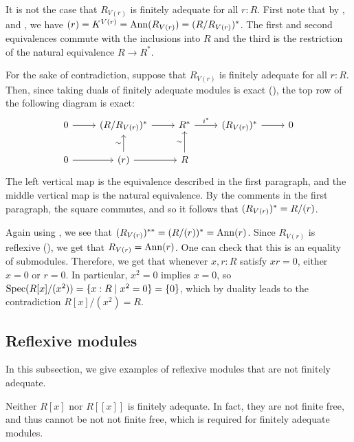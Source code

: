 \begin{counterexample}\label{cex:R_V(r)-not-reflexive}
  It is not the case that $R_{V(r)}$ is finitely adequate for all $r : R$.
  First note that by ,  and , we have $(r) = K^{V(r)} = \operatorname{Ann}(R_{V(r)}) = (R/R_{V(r)})^*$.
  The first and second equivalences commute with the inclusions into $R$ and the third is the restriction of the natural equivalence $R \to R^*$.

  For the sake of contradiction, suppose that $R_{V(r)}$ is finitely adequate for all $r : R$.
  Then, since taking duals of finitely adequate modules is exact (), the top row of the
  following diagram is exact:
  \begin{equation*}
    \begin{tikzcd}
      0 \ar{r} & (\quot{R}{R_{V(r)}})^* \ar{r} & R^* \ar{r}{i^*} & (R_{V(r)})^* \ar{r} & 0 \\
      0 \ar{r} & \ideal{r} \ar{u}{\sim} \ar{r} & R \ar{u}{\sim} & &
    \end{tikzcd}
  \end{equation*}
  The left vertical map is the equivalence described in the first paragraph,
  and the middle vertical map is the natural equivalence.
  By the comments in the first paragraph, the square commutes, and so it follows
  that $(R_{V(r)})^* = R/(r)$.

  Again using , we see that $(R_{V(r)})^{**} = (R/(r))^* = \operatorname{Ann}(r)$.
  Since $R_{V(r)}$ is reflexive (), we get that
  $R_{V(r)} = \operatorname{Ann}(r)$.
  One can check that this is an equality of submodules.
  Therefore, we get that whenever $x, r : R$ satisfy $xr = 0$, either $x = 0$ or $r = 0$.
  In particular, $x^2 = 0$ implies $x = 0$,
  so $\operatorname{Spec}(R[x]/(x^2)) = \{x:R \mid x^2 = 0\} = \{0\}$,
  which by duality leads to the contradiction $R[x]/(x^2) = R$.
\end{counterexample}

\subsection{Reflexive modules}\label{ss:ex-reflexive}

In this subsection, we give examples of reflexive modules that are not finitely adequate.

\begin{counterexample}\label{cex:polynomial-power-series-not-fin-adeq}
  Neither $R[x]$ nor $R[[x]]$ is finitely adequate.
  In fact, they are not finite free, and thus cannot be not not finite free, which is required for finitely adequate modules.
\end{counterexample}

